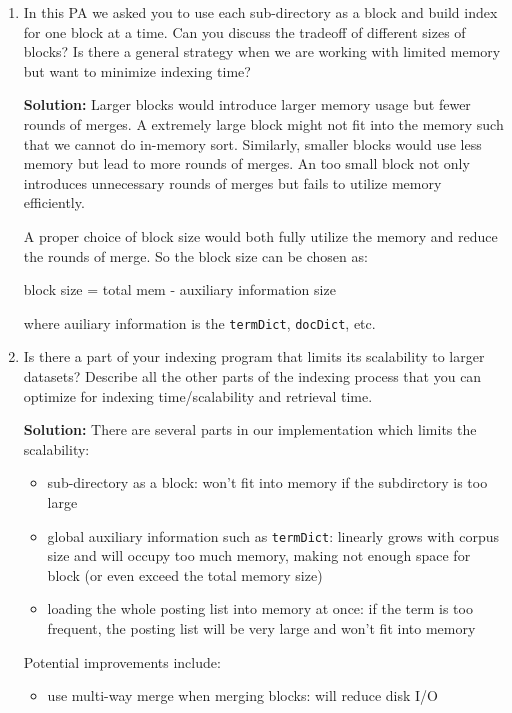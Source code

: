 \documentclass{article}
\newcommand{\tmtextbf}[1]{{\bfseries{#1}}}
\newcommand{\tmtt}[1]{\texttt{#1}}
\newenvironment{enumeratealpha}{\begin{enumerate}[a{\textup{)}}] }{\end{enumerate}}
\begin{document}
\begin{enumeratealpha}
  \item In this PA we asked you to use each sub-directory as a block and build
  index for one block at a time. Can you discuss the tradeoff of different
  sizes of blocks? Is there a general strategy when we are working with
  limited memory but want to minimize indexing time?
  
  \tmtextbf{Solution:} Larger blocks would introduce larger memory usage but
  fewer rounds of merges. A extremely large block might not fit into the
  memory such that we cannot do in-memory sort. Similarly, smaller blocks
  would use less memory but lead to more rounds of merges. An too small block
  not only introduces unnecessary rounds of merges but fails to utilize memory
  efficiently.
  
  A proper choice of block size would both fully utilize the memory and reduce
  the rounds of merge. So the block size can be chosen as:
  
  \begin{center}
    block size = total mem - auxiliary information size
  \end{center}
  
  where auiliary information is the {\tmtt{termDict}}, {\tmtt{docDict}}, etc.
  
  \item Is there a part of your indexing program that limits its scalability
  to larger datasets? Describe all the other parts of the indexing process
  that you can optimize for indexing time/scalability and retrieval time.
  
  \tmtextbf{Solution:} There are several parts in our implementation which
  limits the scalability:
  \begin{itemize}
    \item sub-directory as a block: won't fit into memory if the subdirctory
    is too large
    
    \item global auxiliary information such as {\tmtt{termDict}}: linearly
    grows with corpus size and will occupy too much memory, making not enough
    space for block (or even exceed the total memory size)
    
    \item loading the whole posting list into memory at once: if the term is
    too frequent, the posting list will be very large and won't fit into
    memory
  \end{itemize}
  Potential improvements include:
  \begin{itemize}
    \item use multi-way merge when merging blocks: will reduce disk I/O
    

\end{itemize}
\end{enumeratealpha}
\end{document}
